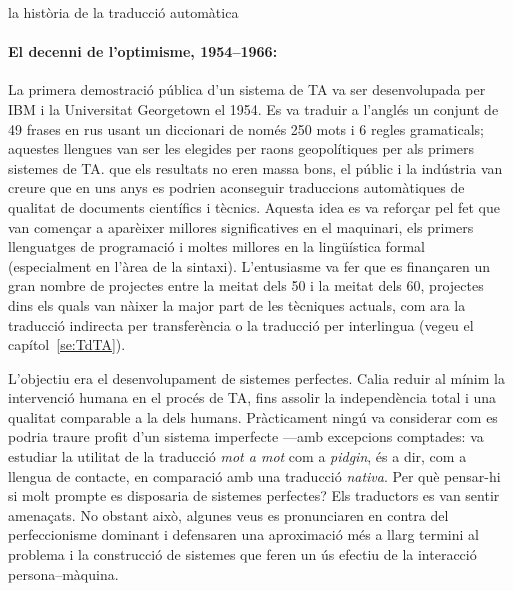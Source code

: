 \begin{persabermes}{la història de la traducció automàtica}
\paragraph{El decenni de l'optimisme, 1954--1966:}
La primera demostració pública d'un sistema de TA va ser desenvolupada
per IBM i la Universitat Georgetown el 1954.  Es va traduir a l'anglés
un conjunt de 49 frases en rus usant un diccionari de només 250 mots i
6 regles gramaticals; aquestes llengues van ser les elegides per raons
geopolítiques per als primers sistemes de TA.  que els resultats no
eren massa bons, el públic i la indústria van creure que en uns anys
es podrien aconseguir traduccions automàtiques de qualitat de
documents científics i tècnics.  Aquesta idea es va reforçar pel fet
que van començar a aparèixer millores significatives en el maquinari,
els primers llenguatges de programació i moltes millores en la
lingüística formal (especialment en l'àrea de la
sintaxi). L'entusiasme va fer que es finançaren un gran nombre de projectes
entre la meitat dels 50 i la meitat dels 60, projectes dins els quals
van nàixer la major part de les tècniques actuals, com ara la
traducció indirecta per transferència o la traducció per interlingua
(vegeu el capítol~\ref{se:TdTA}).


L'objectiu era el desenvolupament de sistemes perfectes. Calia reduir
al mínim la intervenció humana en el procés de TA, fins assolir la
independència total i una qualitat comparable a la dels
humans. Pràcticament ningú va considerar com es podria traure profit
d'un sistema imperfecte ---amb excepcions comptades:
\cite{masterman67b} va estudiar la utilitat de la traducció \emph{mot
  a mot} com a \emph{pidgin}, és a dir, com a llengua de contacte, en
comparació amb una traducció \emph{nativa}. Per què pensar-hi si molt prompte
es disposaria de sistemes perfectes? Els traductors es van sentir
amenaçats. No obstant això, algunes veus es pronunciaren en contra del
perfeccionisme dominant i defensaren una aproximació més a llarg
termini al problema i la construcció de sistemes que feren un ús
efectiu de la interacció persona--màquina.


\end{persabermes}
